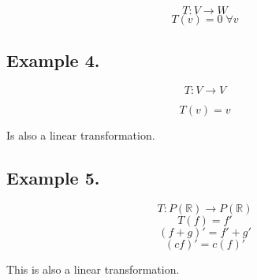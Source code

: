 \documentclass{article}
\newtheorem{one minute paper}[theorem]{One Minute Paper}
\begin{document}
\begin{equation}
    T: V \rightarrow W
\end{equation}
\begin{equation}
    T(v) = 0 \; \forall v
\end{equation}

\subsection*{Example 4.}

\begin{equation}
    T: V \rightarrow V
\end{equation}

\begin{equation}
    T(v) = v
\end{equation}

Is also a linear transformation. 

\subsection*{Example 5.}

\begin{equation}
    T: P(\mathbb{R}) \rightarrow P(\mathbb{R})
\end{equation}
\begin{equation}
    T(f) = f'
\end{equation}
\begin{equation}
    (f+g)' = f' + g'
\end{equation}
\begin{equation}
    (cf)' = c(f)'
\end{equation}

This is also a linear transformation. 
\end{document}
